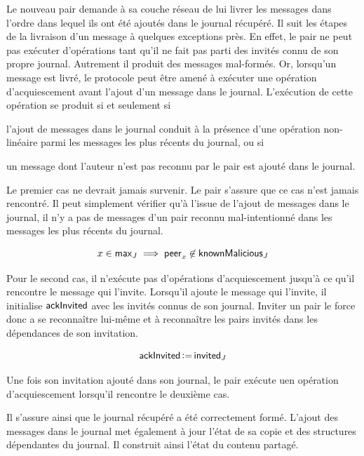 Le nouveau pair demande à sa couche réseau de lui livrer les messages dans l'ordre dans lequel ils ont été ajoutés dans le journal récupéré.
Il suit les étapes de la livraison d'un message à quelques exceptions près.
En effet, le pair ne peut pas exécuter d'opérations tant qu'il ne fait pas parti des invités connu de son propre journal.
Autrement il produit des messages mal-formés.
Or, lorsqu'un message est livré, le protocole peut être amené à exécuter une opération d'acquiescement avant l'ajout d'un message dans le journal.
L'exécution de cette opération se produit si et seulement si \begin{inlinelist}
\item l'ajout de messages dans le journal conduit à la présence d'une opération non-linéaire parmi les messages les plus récents du journal, ou si
\item un message dont l'auteur n'est pas reconnu par le pair est ajouté dans le journal.
\end{inlinelist}
Le premier cas ne devrait jamais survenir.
Le pair s'assure que ce cas n'est jamais rencontré.
Il peut simplement vérifier qu'à l'issue de l'ajout de messages dans le journal, il n'y a pas de messages d'un pair reconnu mal-intentionné dans les messages les plus récents du journal.

\begin{equation*}
    x \in \operatorname{\mathsf{max}}_J \implies \operatorname{\mathsf{peer}}_x \not\in \operatorname{\mathsf{knownMalicious}}_J
\end{equation*}

Pour le second cas, il n'exécute pas d'opérations d'acquiescement jusqu'à ce qu'il rencontre le message qui l'invite.
Lorsqu'il ajoute le message qui l'invite, il initialise $\operatorname{\mathsf{ackInvited}}$ avec les invités connus de son journal.
Inviter un pair le force donc a se reconnaître lui-même et à reconnaître les pairs invités dans les dépendances de son invitation.

\begin{equation*}
    \operatorname{\mathsf{ackInvited}} \operatorname{\vcentcolon=} \operatorname{\mathsf{invited}}_J
\end{equation*}

Une fois son invitation ajouté dans son journal, le pair exécute uen opération d'acquiescement lorsqu'il rencontre le deuxième cas.

Il s'assure ainsi que le journal récupéré a été correctement formé.
L'ajout des messages dans le journal met également à jour l'état de sa copie et des structures dépendantes du journal.
Il construit ainsi l'état du contenu partagé.

